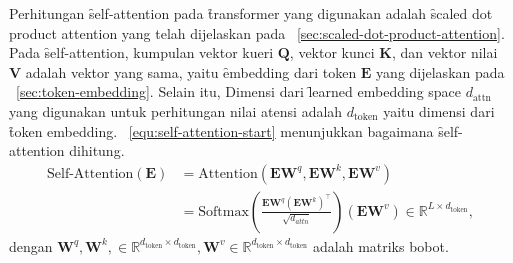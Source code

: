 	Perhitungan \f{self-attention} pada \f{transformer} yang digunakan adalah \f{scaled dot product attention} yang telah dijelaskan pada \sect~\ref{sec:scaled-dot-product-attention}. Pada \f{self-attention}, kumpulan vektor kueri $\mathbf{Q}$, vektor kunci $\mathbf{K}$, dan vektor nilai $\mathbf{V}$ adalah vektor yang sama, yaitu \f{embedding} dari token $\mathbf{E}$ yang dijelaskan pada \sect~\ref{sec:token-embedding}. Selain itu, Dimensi dari \f{learned embedding space} $d_{\text{attn}}$ yang digunakan untuk perhitungan nilai atensi adalah $d_{\text{token}}$ yaitu dimensi dari \f{token embedding}. \equ~\ref{equ:self-attention-start} menunjukkan bagaimana \f{self-attention} dihitung.
	\begin{align}
		\label{equ:self-attention-start}
		\nonumber
		\text{Self-Attention}(\mathbf{E}) &= \text{Attention}(\mathbf{EW}^q, \mathbf{EW}^k, \mathbf{EW}^v) \\
		&= \text{Softmax}(\frac{\mathbf{E} \mathbf{W}^q (\mathbf{E} \mathbf{W}^k)^{\top}}{\sqrt{d_{attn}}}) (\mathbf{E} \mathbf{W}^v) \in \mathbb{R}^{L \times d_{\text{token}}},
	\end{align}
	dengan $\mathbf{W}^q, \mathbf{W}^k, \in \mathbb{R}^{d_{\text{token}} \times d_{\text{token}}}, \mathbf{W}^v \in \mathbb{R}^{d_{\text{token}} \times d_{\text{token}}}$ adalah matriks bobot.


